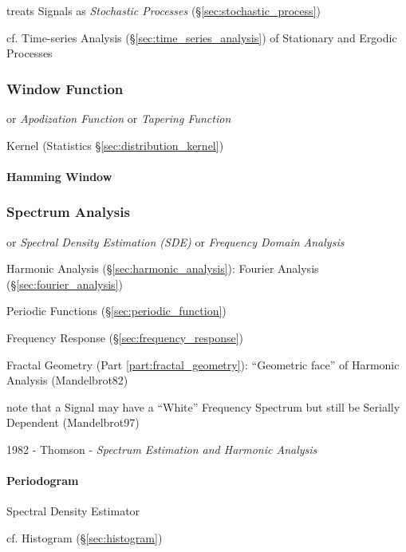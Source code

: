 treats Signals as \emph{Stochastic Processes} (\S\ref{sec:stochastic_process})

\fist cf. Time-series Analysis (\S\ref{sec:time_series_analysis}) of Stationary
and Ergodic Processes



\subsubsection{Window Function}\label{sec:window_function}

or \emph{Apodization Function} or \emph{Tapering Function}

\fist Kernel (Statistics \S\ref{sec:distribution_kernel})



\paragraph{Hamming Window}\label{sec:hamming_window}\hfill



\subsubsection{Spectrum Analysis}\label{sec:spectrum_analysis}

or \emph{Spectral Density Estimation (SDE)} or \emph{Frequency Domain Analysis}

Harmonic Analysis (\S\ref{sec:harmonic_analysis}): Fourier Analysis
(\S\ref{sec:fourier_analysis})

Periodic Functions (\S\ref{sec:periodic_function})

\fist Frequency Response (\S\ref{sec:frequency_response})

\fist Fractal Geometry (Part \ref{part:fractal_geometry}): ``Geometric face'' of
Harmonic Analysis (Mandelbrot82)

note that a Signal may have a ``White'' Frequency Spectrum but still be Serially
Dependent (Mandelbrot97)

1982 - Thomson - \emph{Spectrum Estimation and Harmonic Analysis}



\paragraph{Periodogram}\label{sec:periodogram}\hfill

Spectral Density Estimator

cf. Histogram (\S\ref{sec:histogram})



